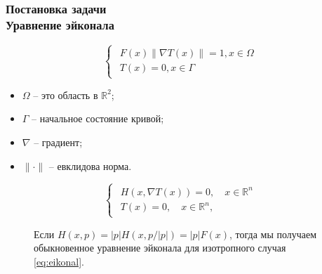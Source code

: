 \documentclass[hyperref={unicode=true},professionalfont]{beamer}
\newcommand{\stamp}{
	\begin{frame}[plain,noframenumbering]
		\begin{table}[h!]
			\flushright
			\vspace{5cm}
			\begin{adjustbox}{max width=0.7\textwidth}
				\begin{tabular}{
					|>{\footnotesize}p{0.8cm}|
					>{\footnotesize}p{0.8cm}|
					>{\footnotesize}p{2.2cm}|
					>{\footnotesize}p{1.1cm}|
					>{\footnotesize}p{0.8cm}|
					>{\footnotesize}p{5cm}|
					>{\footnotesize}p{0.1cm}|
					>{\footnotesize}p{0.1cm}|
					>{\footnotesize}p{0.1cm}|
					>{\footnotesize}p{0.8cm}|
					>{\footnotesize}p{1.4cm}|
				}
					\hline
					&&&&& \multicolumn{6}{>{\footnotesize}c|}{\multirow{3}{*}{\Large 0.043.00.00 ПЗ}} \\ \cline{1-5}
					&&&&& \multicolumn{6}{>{\footnotesize}c|}{} \\ \cline{1-5}
					Изм. & Лист & № Документа & Подпись & Дата & \multicolumn{6}{>{\footnotesize}c|}{} \\ \hline
					\multicolumn{2}{|>{\footnotesize}l|}{Разработал}
                    & Апанович Д.В. &  &  &
                                            \multirow{4}{5cm}{\centering
                                            Параллельный алгоритм
                                            численного решения
                                            анизотропного уравнения эйконала} & \multicolumn{3}{>{\footnotesize}l|}{Лит.} & Лист & Листов \\ \cline{1-5}\cline{7-11}
					\multicolumn{2}{|>{\footnotesize}l|}{Проверил}
                    & Казаков А.Л. &  &  &  & У & & & \insertframenumber & \inserttotalframenumber \\ \cline{1-5}\cline{7-11}
					\multicolumn{2}{|>{\footnotesize}l|}{Нормоконтролер}
                    & Казаков А.Л. &  &  &  & \multicolumn{5}{>{\footnotesize}l|}{} \\ \cline{1-5}
					\multicolumn{2}{|>{\footnotesize}l|}{} &  &  &  &  & \multicolumn{5}{>{\footnotesize}l|}{Кафедра АС, гр. ИСТм-16-1} \\ \cline{1-5}
					\multicolumn{2}{|>{\footnotesize}l|}{Утвердил}
                    & Бахвалов С.В. &  &  &  & \multicolumn{5}{>{\footnotesize}l|}{} \\ \hline

				\end{tabular}
			\end{adjustbox}
		\end{table}

	\end{frame}
}
\renewcommand{\stamp}{}
\begin{document}
\begin{frame}
\frametitle{Постановка задачи \\ Уравнение эйконала}
\begin{figure}[ht]
  \begin{equation}
    \label{eq:eikonal}
    \begin{cases}
      \begin{array}{ll}
        F(x) \| \nabla T(x) \| = 1, x \in \Omega \\
        T(x) = 0, x \in \Gamma
      \end{array}
    \end{cases}
  \end{equation}


\end{figure}


\begin{itemize}
\item $\Omega$ -- это область в $\mathbb{R}^2$;
\item $\Gamma$ -- начальное состояние кривой;
\item $\nabla$ -- градиент;
\item $\| \cdot \|$ -- евклидова норма.
\end{itemize}

\begin{figure}[ht]

\begin{equation}
  \label{eq:hje}
  \begin{cases}
    \begin{array}{ll}
      H(x, \nabla T(x)) = 0,\quad x \in \mathbb{R}^n  \\
      T(x) = 0, \quad  x \in \mathbb{R}^n,
    \end{array}
  \end{cases}
\end{equation}

Если $H(x,p) = |p| H(x,p/|p|) = |p| F(x)$, тогда мы получаем
обыкновенное уравнение эйконала для изотропного случая
\eqref{eq:eikonal}.

\end{figure}
\end{frame}
\stamp

\end{document}
